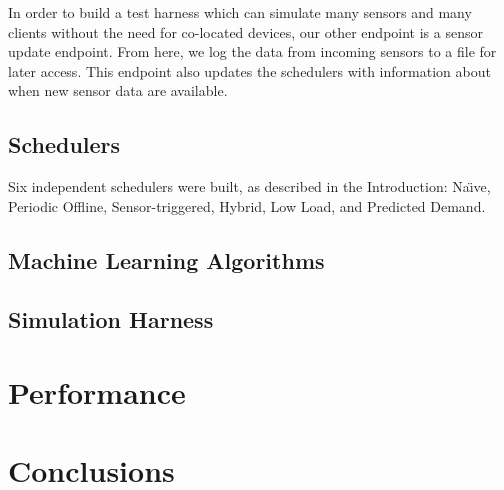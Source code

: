 \documentclass[a4paper]{acm_proc_article-sp}
\begin{document}
In order to build a test harness which can simulate many sensors and many clients without the need for co-located devices, our other endpoint is a sensor update endpoint.  From here, we log the data from incoming sensors to a file for later access.  This endpoint also updates the schedulers with information about when new sensor data are available.

\subsection{Schedulers}

Six independent schedulers were built, as described in the Introduction: Na\"{\i}ve, Periodic Offline, Sensor-triggered, Hybrid, Low Load, and Predicted Demand.

\subsection{Machine Learning Algorithms}

\subsection{Simulation Harness}

\section{Performance}

\section{Conclusions}



\end{document}
